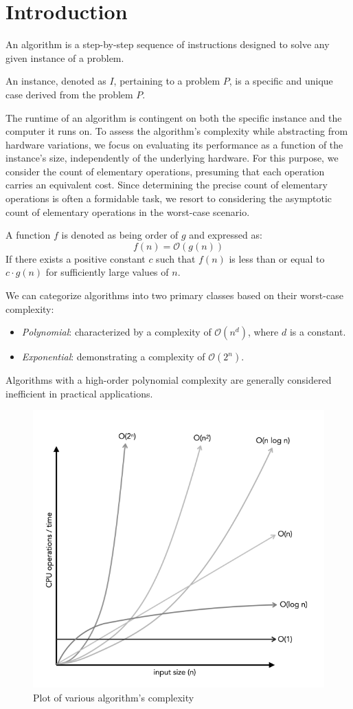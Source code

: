 \section{Introduction}

\begin{definition}
    An algorithm is a step-by-step sequence of instructions designed to solve any given instance of a problem.
\end{definition}
\begin{definition}
    An instance, denoted as $I$, pertaining to a problem $P$, is a specific and unique case derived from the problem $P$.
\end{definition}

The runtime of an algorithm is contingent on both the specific instance and the computer it runs on. 
To assess the algorithm's complexity while abstracting from hardware variations, we focus on evaluating its performance as a function of the instance's size, independently of the underlying hardware. 
For this purpose, we consider the count of elementary operations, presuming that each operation carries an equivalent cost. 
Since determining the precise count of elementary operations is often a formidable task, we resort to considering the asymptotic count of elementary operations in the worst-case scenario.
\begin{definition}
    A function $f$ is denoted as being order of $g$ and expressed as:
    \[f(n)=\mathcal{O}(g(n))\]
    If there exists a positive constant $c$ such that $f(n)$ is less than or equal to $c \cdot g(n)$ for sufficiently large values of $n$.
\end{definition}
We can categorize algorithms into two primary classes based on their worst-case complexity:
\begin{itemize}
    \item \textit{Polynomial}: characterized by a complexity of $\mathcal{O}(n^d)$, where $d$ is a constant.
    \item \textit{Exponential}: demonstrating a complexity of $\mathcal{O}(2^n)$. 
\end{itemize}
Algorithms with a high-order polynomial complexity are generally considered inefficient in practical applications.
\begin{figure}[H]
    \centering
    \includegraphics[width=0.5\linewidth]{images/complexity.png}
    \caption{Plot of various algorithm's complexity}
\end{figure}
